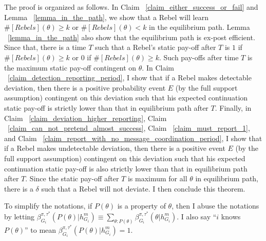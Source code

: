 \documentclass[12pt,letterpaper]{article}
\theoremstyle{definition}
\theoremstyle{remark}
\theoremstyle{claim}
\begin{document}
The proof is organized as follows. In Claim ~\ref{claim_either_success_or_fail} and Lemma ~\ref{lemma_in_the_path}, we show that a Rebel will learn $\#[Rebels](\theta)\geq k$ or $\#[Rebels](\theta)< k$ in the equilibrium path. Lemma ~\ref{lemma_in_the_path} also show that the equilibrium path is ex-post efficient. Since that, there is a time $T$ such that a Rebel's static pay-off after $T$ is $1$ if $\#[Rebels](\theta)\geq k$ or $0$ if $\#[Rebels](\theta)\geq k$. Such pay-offs after time $T$ is the maximum static pay-off contingent on $\theta$. In Claim ~\ref{claim_detection_reporting_period}, I show that if a Rebel makes detectable deviation, then there is a positive probability event $E$ (by the full support assumption) contingent on this deviation such that his expected continuation static pay-off is strictly lower than that in equilibrium path after $T$. Finally, in Claim ~\ref{claim_deviation_higher_reporting}, Claim ~\ref{claim_can_not_pretend_almost_success}, Claim ~\ref{claim_must_report_1}, and Claim ~\ref{claim_report_with_no_message_coordination_period}, I show that if a Rebel makes undetectable deviation, then there is a positive event $E$ (by the full support assumption) contingent on this deviation such that his expected continuation static pay-off is also strictly lower than that in equilibrium path after $T$. Since the static pay-off after $T$ is maximum for all $\theta$ in equilibrium path, there is a $\delta$ such that a Rebel will not deviate. I then conclude this theorem.

To simplify the notations, if $P(\theta)$ is a property of $\theta$, then I abuse the notations by letting $\beta^{\pi,\tau^*}_{G_i}(P(\theta)|h^{m}_{G_i})\equiv \sum_{\theta:P(\theta)}\beta^{\pi,\tau^*}_{G_i}(\theta|h^{m}_{G_i})$. I also say ``$i$ knows $P(\theta)$'' to mean $\beta^{\pi,\tau^*}_{G_i}(P(\theta)|h^{m}_{G_i})=1$. 
\end{document}
